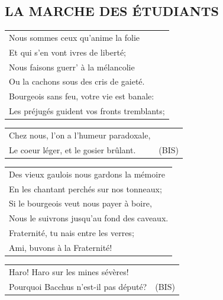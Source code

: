 \documentclass[a4paper, 14pt]{extarticle}
\begin{document}
\subsection*{LA MARCHE DES ÉTUDIANTS}
\begin{flushleft}
\begin{tabularx}{\textwidth} {
    >{\raggedright\arraybackslash}X}
Nous sommes ceux qu’anime la folie\\
Et qui s’en vont ivres de liberté;\\
Nous faisons guerr’ à la mélancolie\\
Ou la cachons sous des cris de gaieté.\\
Bourgeois sans feu, votre vie est banale:\\
Les préjugés guident vos fronts tremblants;\\
\end{tabularx}
\begin{tabularx}{\textwidth} {
    >{\raggedright\arraybackslash}X|c}
Chez nous, l’on a l’humeur paradoxale, &\\
Le coeur léger, et le gosier brûlant. & (BIS)\\
\end{tabularx}
\end{flushleft}
\begin{flushleft}
\begin{tabularx}{\textwidth} {
    >{\raggedright\arraybackslash}X}
Des vieux gaulois nous gardons la mémoire\\
En les chantant perchés sur nos tonneaux;\\
Si le bourgeois veut nous payer à boire,\\
Nous le suivrons jusqu’au fond des caveaux.\\
Fraternité, tu nais entre les verres;\\
Ami, buvons à la Fraternité!\\
\end{tabularx}
\begin{tabularx}{\textwidth} {
    >{\raggedright\arraybackslash}X|c}
Haro! Haro sur les mines sévères! & \\
Pourquoi Bacchus n’est-il pas député? & (BIS)\\
\end{tabularx}
\end{flushleft}
\end{document}
